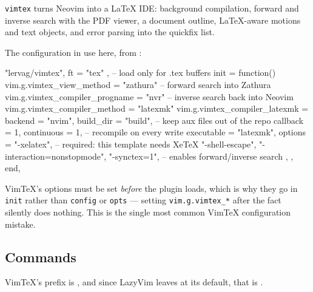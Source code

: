 \texttt{vimtex} \cite{vimtex} turns Neovim into a \LaTeX{} IDE: background compilation, forward
and inverse search with the PDF viewer, a document outline, \LaTeX-aware motions
and text objects, and error parsing into the quickfix list.

The configuration in use here, from :

\begin{luacode}
{
  "lervag/vimtex",
  ft = { "tex" },                          -- load only for .tex buffers
  init = function()
    vim.g.vimtex_view_method = "zathura"   -- forward search into Zathura
    vim.g.vimtex_compiler_progname = "nvr" -- inverse search back into Neovim
    vim.g.vimtex_compiler_method = "latexmk"
    vim.g.vimtex_compiler_latexmk = {
      backend = "nvim",
      build_dir = "build",                 -- keep aux files out of the repo
      callback = 1,
      continuous = 1,                      -- recompile on every write
      executable = "latexmk",
      options = {
        "-xelatex",                        -- required: this template needs XeTeX
        "-shell-escape",
        "-interaction=nonstopmode",
        "-synctex=1",                      -- enables forward/inverse search
      },
    },
  end,
}
\end{luacode}

\begin{note}
	VimTeX's options must be set \emph{before} the plugin loads, which is why they
	go in \texttt{init} rather than \texttt{config} or \texttt{opts} --- setting
	\texttt{vim.g.vimtex\_*} after the fact silently does nothing. This is the
	single most common VimTeX configuration mistake.
\end{note}

\subsection{Commands}

VimTeX's prefix is  , and since LazyVim leaves
 at its default, that is \key{\textbackslash} .

